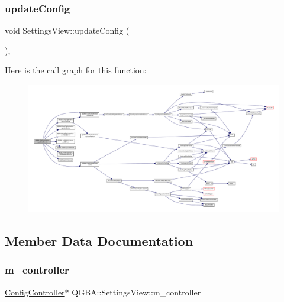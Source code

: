 \subsubsection{\texorpdfstring{update\+Config}{updateConfig}}
{\footnotesize\ttfamily void Settings\+View\+::update\+Config (\begin{DoxyParamCaption}{ }\end{DoxyParamCaption})\hspace{0.3cm}{\ttfamily [private]}, {\ttfamily [slot]}}

Here is the call graph for this function\+:
\nopagebreak
\begin{figure}[H]
\begin{center}
\leavevmode
\includegraphics[width=350pt]{class_q_g_b_a_1_1_settings_view_a9290a71650ae7d397628f548b709e859_cgraph}
\end{center}
\end{figure}


\subsection{Member Data Documentation}
\mbox{\label{class_q_g_b_a_1_1_settings_view_a833c971ea56f66d4c3960744d88715c8}} 
\subsubsection{\texorpdfstring{m\+\_\+controller}{m\_controller}}
{\footnotesize\ttfamily \mbox{\hyperlink{class_q_g_b_a_1_1_config_controller}{Config\+Controller}}$\ast$ Q\+G\+B\+A\+::\+Settings\+View\+::m\+\_\+controller\hspace{0.3cm}{\ttfamily [private]}}

